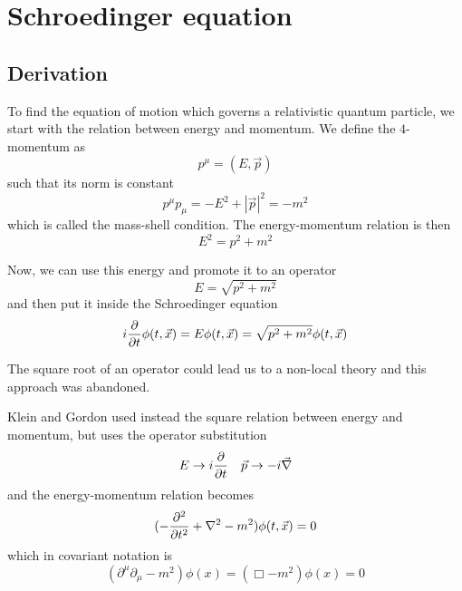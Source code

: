\part{Schroedinger equation}

\chapter{Derivation}

    To find the equation of motion which governs a relativistic quantum particle, we start with the relation between energy and momentum. We define the $4$-momentum as 
    \begin{equation*}
        p^\mu = (E, \vec p)
    \end{equation*}
    such that its norm is constant
    \begin{equation*}
        p^\mu p_\mu = - E^2 + |\vec p|^2 = - m^2
    \end{equation*}
    which is called the mass-shell condition. The energy-momentum relation is then
    \begin{equation}\label{enmom}
        E^2 = p^2 + m^2
    \end{equation}

    Now, we can use this energy and promote it to an operator
    \begin{equation*}
        E = \sqrt{p^2 + m^2}
    \end{equation*}
    and then put it inside the Schroedinger equation 
    \begin{equation*}
        i \frac{\partial}{\partial t} \phi(t, \vec x) = E \phi(t, \vec x) = \sqrt{p^2 + m^2} \phi(t, \vec x) 
    \end{equation*}

    The square root of an operator could lead us to a non-local theory and this approach was abandoned. 

    Klein and Gordon used instead the square relation between energy and momentum, but uses the operator substitution 
    \begin{equation}\label{sub}
        E \rightarrow i \frac{\partial}{\partial t} \quad \vec p \rightarrow - i \vec \nabla
    \end{equation}
    and the energy-momentum relation becomes 
    \begin{equation*}
        (- \frac{\partial^2 }{\partial t^2} + \nabla^2 - m^2) \phi(t, \vec x) = 0
    \end{equation*}
    which in covariant notation is 
    \begin{equation}\label{kgeq}
        (\partial^\mu \partial_\mu - m^2) \phi(x) = (\Box - m^2) \phi(x) = 0
    \end{equation}
